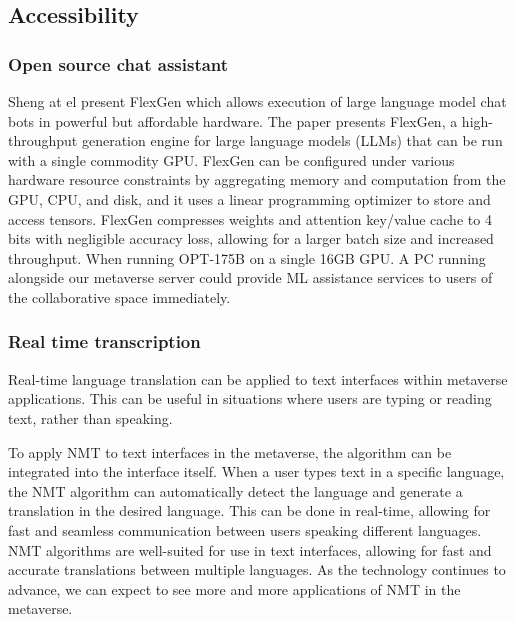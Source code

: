 \subsection{Accessibility}
\subsubsection{Open source chat assistant}
Sheng at el present FlexGen which allows execution of large language model chat bots in powerful but affordable hardware\cite{Sheng2023}. The paper presents FlexGen, a high-throughput generation engine for large language models (LLMs) that can be run with a single commodity GPU. FlexGen can be configured under various hardware resource constraints by aggregating memory and computation from the GPU, CPU, and disk, and it uses a linear programming optimizer to store and access tensors. FlexGen compresses weights and attention key/value cache to 4 bits with negligible accuracy loss, allowing for a larger batch size and increased throughput. When running OPT-175B on a single 16GB GPU. A PC running alongside our metaverse server could provide ML assistance services to users of the collaborative space immediately.
\subsubsection{Real time transcription}
Real-time language translation can be applied to text interfaces within metaverse applications. This can be useful in situations where users are typing or reading text, rather than speaking.\par
To apply NMT to text interfaces in the metaverse, the algorithm can be integrated into the interface itself. When a user types text in a specific language, the NMT algorithm can automatically detect the language and generate a translation in the desired language. This can be done in real-time, allowing for fast and seamless communication between users speaking different languages. NMT algorithms are well-suited for use in text interfaces, allowing for fast and accurate translations between multiple languages. As the technology continues to advance, we can expect to see more and more applications of NMT in the metaverse.

